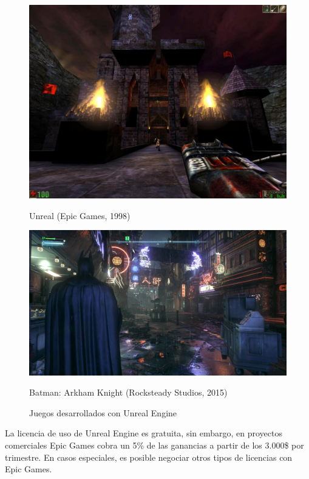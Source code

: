 \begin{figure}[!htb]
   \begin{minipage}{0.5\textwidth}
     \centering
     \includegraphics[width=0.85\linewidth, right]{images/estadodelarte/motores/unreal-original}
     \caption{Unreal (Epic Games, 1998)}
   \end{minipage}\hfill
   \begin {minipage}{0.5\textwidth}
     \centering
     \includegraphics[width=0.85\linewidth, left]{images/estadodelarte/motores/batman-arkham}
     \caption{Batman: Arkham Knight (Rocksteady Studios, 2015)}
   \end{minipage}
   \caption{Juegos desarrollados con Unreal Engine}
\end{figure}

La licencia de uso de Unreal Engine es gratuita, sin embargo, en proyectos comerciales Epic Games cobra un 5\% de las ganancias a partir de los 3.000\$ por trimestre. En casos especiales, es posible negociar otros tipos de licencias con Epic Games.

